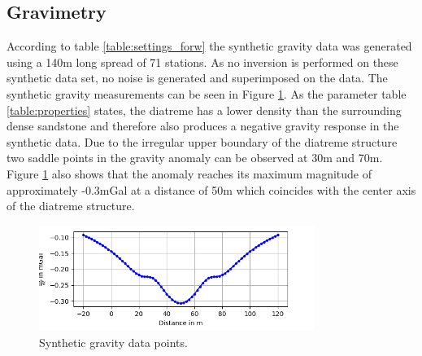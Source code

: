 \subsection{Gravimetry}
According to table \ref{table:settings_forw} the synthetic gravity data was generated using a 140m long spread of 71 stations. As no inversion is performed on these synthetic data set, no noise is generated and superimposed on the data. The synthetic gravity measurements can be seen in Figure \ref{figure:grav}. As the parameter table \ref{table:properties} states, the diatreme has a lower density than the surrounding dense sandstone and therefore also produces a negative gravity response in the synthetic data. Due to the irregular upper boundary of the diatreme structure two saddle points in the gravity anomaly can be observed at 30m and 70m. Figure \ref{figure:grav} also shows that the anomaly reaches its maximum magnitude of approximately -0.3mGal at a distance of 50m which coincides with the center axis of the diatreme structure.

\begin{figure}[]
  \centering
    \includegraphics[width=0.8\textwidth]{Figures/GRVA_dataonly.png}
    \caption[Synthetic gravity data]{Synthetic gravity data points.}
    \label{figure:grav}
\end{figure}


